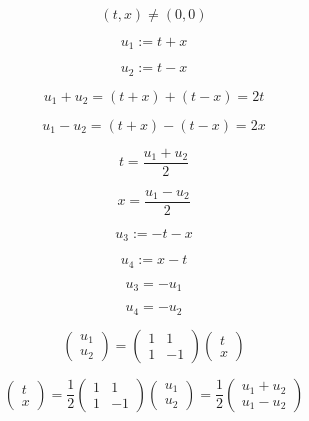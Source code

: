 \documentclass[12pt]{article}
\begin{document}
\begin{equation}
(t,x)\neq(0,0)
\end{equation}

\begin{equation}
u_1:=t+x
\end{equation}

\begin{equation}
u_2:=t-x
\end{equation}

\begin{equation}
u_1+u_2=(t+x)+(t-x)=2t
\end{equation}

\begin{equation}
u_1-u_2=(t+x)-(t-x)=2x
\end{equation}

\begin{equation}
t=\frac{u_1+u_2}{2}
\end{equation}

\begin{equation}
x=\frac{u_1-u_2}{2}
\end{equation}

\begin{equation}
u_3:=-t-x
\end{equation}

\begin{equation}
u_4:=x-t
\end{equation}

\begin{equation}
u_3=-u_1
\end{equation}

\begin{equation}
u_4=-u_2
\end{equation}

\begin{equation}
\begin{pmatrix}
u_1\\
u_2
\end{pmatrix}
=
\begin{pmatrix}
1&1\\
1&-1
\end{pmatrix}
\begin{pmatrix}
t\\
x
\end{pmatrix}
\end{equation}

\begin{equation}
\begin{pmatrix}
t\\
x
\end{pmatrix}
=
\frac12
\begin{pmatrix}
1&1\\
1&-1
\end{pmatrix}
\begin{pmatrix}
u_1\\
u_2
\end{pmatrix}
=
\frac12
\begin{pmatrix}
u_1+u_2\\
u_1-u_2
\end{pmatrix}
\end{equation}
\end{document}
